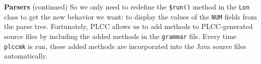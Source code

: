 \begin{minipage}[t]{\sw}
\slidenumber
\LARGE
{\bf Parsers} (continued)\exx
\emm\LightBox{\MYlonGrammarKleene}\exx
So we only need to redefine the \verb'$run()' method
in the \verb'Lon' class to get the new behavior we want:
to display the values of the \verb'NUM' fields from the parse tree.\exx
Fortunately, PLCC allows us to add methods to PLCC-generated source files
by including the added methods in the \verb'grammar' file.
Every time \verb'plccmk' is run,
these added methods are incorporated
into the Java source files automatically.
\end{minipage}
\clearpage
